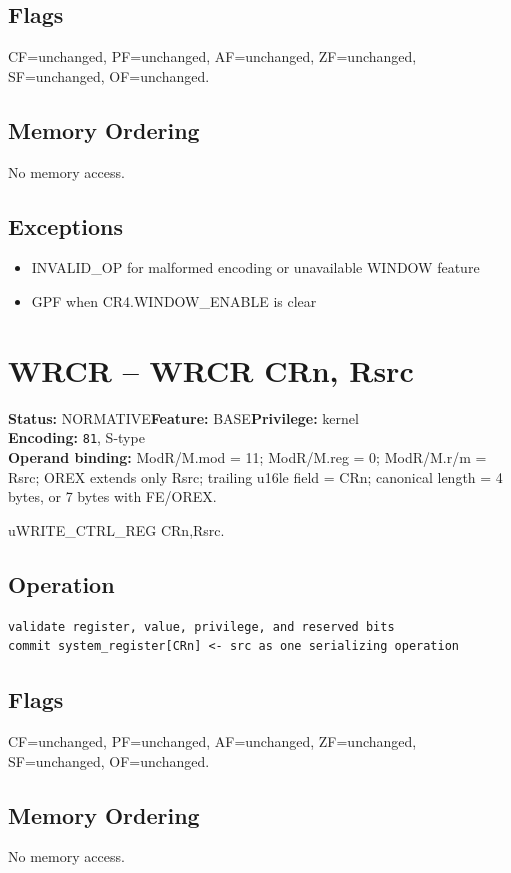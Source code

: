 \documentclass[10pt]{article}
\begin{document}
\subsection*{Flags}
CF=unchanged, PF=unchanged, AF=unchanged, ZF=unchanged, SF=unchanged, OF=unchanged.
\subsection*{Memory Ordering}
No memory access.
\subsection*{Exceptions}
\begin{itemize}
\item INVALID\_OP for malformed encoding or unavailable WINDOW feature
\item GPF when CR4.WINDOW\_ENABLE is clear
\end{itemize}
\clearpage

\section{WRCR -- WRCR CRn, Rsrc}
\textbf{Status:} NORMATIVE\quad \textbf{Feature:} BASE\quad \textbf{Privilege:} kernel\\
\textbf{Encoding:} \texttt{81}, S-type\\
\textbf{Operand binding:} ModR/M.mod = 11; ModR/M.reg = 0; ModR/M.r/m = Rsrc; OREX extends only Rsrc; trailing u16le field = CRn; canonical length = 4 bytes, or 7 bytes with FE/OREX.

uWRITE\_CTRL\_REG CRn,Rsrc.

\subsection*{Operation}
\begin{lstlisting}
validate register, value, privilege, and reserved bits
commit system_register[CRn] <- src as one serializing operation
\end{lstlisting}
\subsection*{Flags}
CF=unchanged, PF=unchanged, AF=unchanged, ZF=unchanged, SF=unchanged, OF=unchanged.
\subsection*{Memory Ordering}
No memory access.
\end{document}
